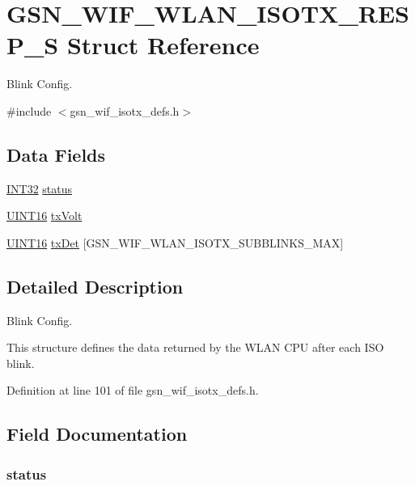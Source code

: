 \hypertarget{a00384}{
\section{GSN\_\-WIF\_\-WLAN\_\-ISOTX\_\-RESP\_\-S Struct Reference}
\label{a00384}
}


Blink Config.  




{\ttfamily \#include $<$gsn\_\-wif\_\-isotx\_\-defs.h$>$}

\subsection*{Data Fields}
\begin{DoxyCompactItemize}
\item 
\hyperlink{a00660_ga63021d67d54286c2163bcdb43a6f2569}{INT32} \hyperlink{a00384_ace2e01f5af9f89f72123dd8a132b9551}{status}
\item 
\hyperlink{a00660_ga09f1a1fb2293e33483cc8d44aefb1eb1}{UINT16} \hyperlink{a00384_af0db1cb3f04aeef18e0380f46296ec42}{txVolt}
\item 
\hyperlink{a00660_ga09f1a1fb2293e33483cc8d44aefb1eb1}{UINT16} \hyperlink{a00384_a93867b08eedbd25ecb7eee27c16f703f}{txDet} \mbox{[}GSN\_\-WIF\_\-WLAN\_\-ISOTX\_\-SUBBLINKS\_\-MAX\mbox{]}
\end{DoxyCompactItemize}


\subsection{Detailed Description}
Blink Config. 

This structure defines the data returned by the WLAN CPU after each ISO blink. 

Definition at line 101 of file gsn\_\-wif\_\-isotx\_\-defs.h.



\subsection{Field Documentation}
\hypertarget{a00384_ace2e01f5af9f89f72123dd8a132b9551}{
\subsubsection[{status}]{ {\bf status}}}
\label{a00384_ace2e01f5af9f89f72123dd8a132b9551}


